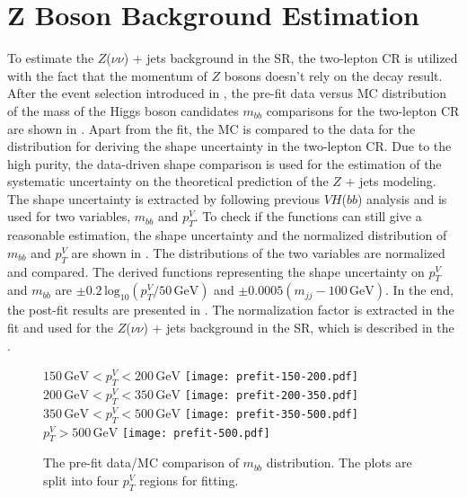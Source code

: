 \documentclass[class=NTHU_thesis, crop=false]{standalone}
\begin{document}
\chapter{Z Boson Background Estimation}
\label{chap:Z_bkg_estimation}
To estimate the $Z$($\nu\nu$) + jets background in the SR, the two-lepton CR is utilized with the fact that the momentum of $Z$ bosons doesn't rely on the decay result. After the event selection introduced in , the pre-fit data versus MC distribution of the mass of the Higgs boson candidates $m_{bb}$ comparisons for the two-lepton CR are shown in . Apart from the fit, the MC is compared to the data for the distribution for deriving the shape uncertainty in the two-lepton CR. Due to the high purity, the data-driven shape comparison is used for the estimation of the systematic uncertainty on the theoretical prediction of the $Z$ + jets modeling. The shape uncertainty is extracted by following previous $VH$($bb$) analysis \cite{ATLAS-CONF-2018-036} and is used for two variables, $m_{bb}$ and $p^V_T$. To check if the functions can still give a reasonable estimation, the shape uncertainty and the normalized distribution of $m_{bb}$ and $p^V_T$ are shown in . The distributions of the two variables are normalized and compared. The derived functions representing the shape uncertainty on $p^V_T$ and $m_{bb}$ are $\pm 0.2\, \mathrm{log}_{10} (p^V_T/50\, \mathrm{GeV})$ and $\pm 0.0005 (m_{jj} - 100\, \mathrm{GeV})$. In the end, the post-fit results are presented in . The normalization factor is extracted in the fit and used for the $Z$($\nu\nu$) + jets background in the SR, which is described in the .

\begin{figure}[!hbt]
	\captionsetup[subfigure]{labelformat=empty}
	\centering
	\subcaptionbox
		{$150\, \mathrm{GeV} < p^V_T < 200\, \mathrm{GeV}$
		\label{fig:2-lep-prefit-fig1}}
		{\texttt{[image: prefit-150-200.pdf]}}
	\subcaptionbox
		{$200\, \mathrm{GeV} < p^V_T < 350\, \mathrm{GeV}$
		\label{fig:2-lep-prefit-fig2}}
		{\texttt{[image: prefit-200-350.pdf]}}
	\vspace{\baselineskip}
	\subcaptionbox
		{$350\, \mathrm{GeV} < p^V_T < 500\, \mathrm{GeV}$
		\label{fig:2-lep-prefit-fig3}}
		{\texttt{[image: prefit-350-500.pdf]}}
	\subcaptionbox
		{$p^V_T > 500\, \mathrm{GeV}$
		\label{fig:2-lep-prefit-fig4}}
		{\texttt{[image: prefit-500.pdf]}}
	\caption{The pre-fit data/MC comparison of $m_{bb}$ distribution. The plots are split into four $p^V_T$ regions for fitting.}
	\label{fig:2-lep-prefit}
\end{figure}
\end{document}
